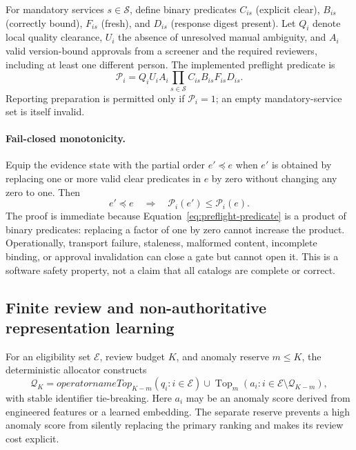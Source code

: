 \documentclass[11pt]{article}
\begin{document}
For mandatory services $s\in\mathcal{S}$, define binary predicates $C_{is}$ (explicit clear), $B_{is}$ (correctly bound), $F_{is}$ (fresh), and $D_{is}$ (response digest present). Let $Q_i$ denote local quality clearance, $U_i$ the absence of unresolved manual ambiguity, and $A_i$ valid version-bound approvals from a screener and the required reviewers, including at least one different person. The implemented preflight predicate is
\begin{equation}
  \mathcal{P}_i
  =Q_iU_iA_i\prod_{s\in\mathcal{S}}C_{is}B_{is}F_{is}D_{is}.
\label{eq:preflight-predicate}
\end{equation}
Reporting preparation is permitted only if $\mathcal{P}_i=1$; an empty mandatory-service set is itself invalid.

\paragraph{Fail-closed monotonicity.}
Equip the evidence state with the partial order $e'\preceq e$ when $e'$ is obtained by replacing one or more valid clear predicates in $e$ by zero without changing any zero to one. Then
\begin{equation}
  e'\preceq e \quad\Longrightarrow\quad
  \mathcal{P}_i(e')\leq\mathcal{P}_i(e).
\label{eq:monotonicity}
\end{equation}
The proof is immediate because Equation~\ref{eq:preflight-predicate} is a product of binary predicates: replacing a factor of one by zero cannot increase the product. Operationally, transport failure, staleness, malformed content, incomplete binding, or approval invalidation can close a gate but cannot open it. This is a software safety property, not a claim that all catalogs are complete or correct.

\subsection{Finite review and non-authoritative representation learning}

For an eligibility set $\mathcal{E}$, review budget $K$, and anomaly reserve $m\leq K$, the deterministic allocator constructs
\begin{equation}
  \mathcal{Q}_K=operatorname{Top}_{K-m}(q_i:i\in\mathcal{E})
  \cup
  \operatorname{Top}_{m}(a_i:i\in\mathcal{E}\setminus\mathcal{Q}_{K-m}),
\label{eq:queue-allocation}
\end{equation}
with stable identifier tie-breaking. Here $a_i$ may be an anomaly score derived from engineered features or a learned embedding. The separate reserve prevents a high anomaly score from silently replacing the primary ranking and makes its review cost explicit.
\end{document}
